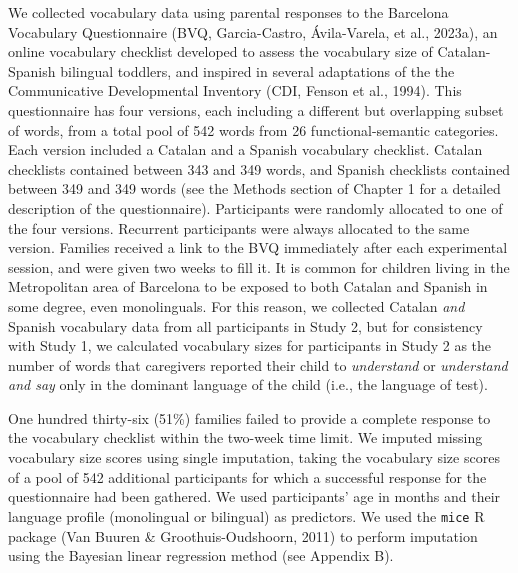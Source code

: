 \documentclass[
  12pt,
  b5paperpaper,
  twoside]{scrreprt}
\begin{document}
We collected vocabulary data using parental responses to the Barcelona
Vocabulary Questionnaire (BVQ, Garcia-Castro, Ávila-Varela, et al.,
2023a), an online vocabulary checklist developed to assess the
vocabulary size of Catalan-Spanish bilingual toddlers, and inspired in
several adaptations of the the Communicative Developmental Inventory
(CDI, Fenson et al., 1994). This questionnaire has four versions, each
including a different but overlapping subset of words, from a total pool
of 542 words from 26 functional-semantic categories. Each version
included a Catalan and a Spanish vocabulary checklist. Catalan
checklists contained between 343 and 349 words, and Spanish checklists
contained between 349 and 349 words (see the Methods section of Chapter
1 for a detailed description of the questionnaire). Participants were
randomly allocated to one of the four versions. Recurrent participants
were always allocated to the same version. Families received a link to
the BVQ immediately after each experimental session, and were given two
weeks to fill it. It is common for children living in the Metropolitan
area of Barcelona to be exposed to both Catalan and Spanish in some
degree, even monolinguals. For this reason, we collected Catalan
\emph{and} Spanish vocabulary data from all participants in Study 2, but
for consistency with Study 1, we calculated vocabulary sizes for
participants in Study 2 as the number of words that caregivers reported
their child to \emph{understand} or \emph{understand and say} only in
the dominant language of the child (i.e., the language of test).

One hundred thirty-six (51\%) families failed to provide a complete
response to the vocabulary checklist within the two-week time limit. We
imputed missing vocabulary size scores using single imputation, taking
the vocabulary size scores of a pool of 542 additional participants for
which a successful response for the questionnaire had been gathered. We
used participants' age in months and their language profile (monolingual
or bilingual) as predictors. We used the \texttt{mice} R package (Van
Buuren \& Groothuis-Oudshoorn, 2011) to perform imputation using the
Bayesian linear regression method (see Appendix B).
\end{document}
